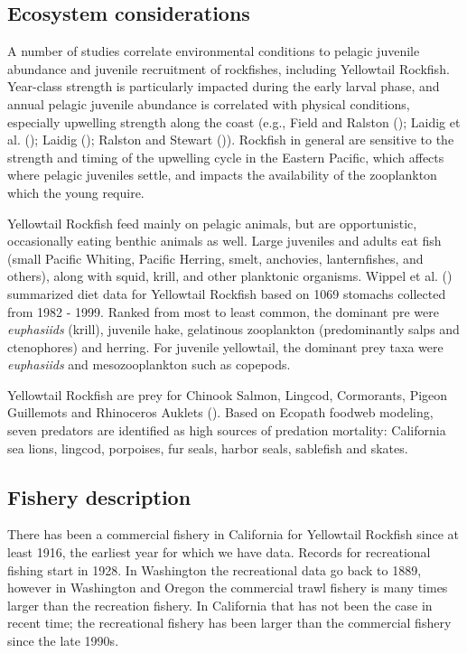 \documentclass[
]{scrartcl}
\begin{document}
\subsection{Ecosystem considerations}\label{ecosystem-considerations-1}

A number of studies correlate environmental conditions to pelagic
juvenile abundance and juvenile recruitment of rockfishes, including
Yellowtail Rockfish. Year-class strength is particularly impacted during
the early larval phase, and annual pelagic juvenile abundance is
correlated with physical conditions, especially upwelling strength along
the coast (e.g., Field and Ralston ();
Laidig et al. (); Laidig
(); Ralston and Stewart
()). Rockfish in general are sensitive
to the strength and timing of the upwelling cycle in the Eastern
Pacific, which affects where pelagic juveniles settle, and impacts the
availability of the zooplankton which the young require.

Yellowtail Rockfish feed mainly on pelagic animals, but are
opportunistic, occasionally eating benthic animals as well. Large
juveniles and adults eat fish (small Pacific Whiting, Pacific Herring,
smelt, anchovies, lanternfishes, and others), along with squid, krill,
and other planktonic organisms. Wippel et al.
() summarized diet data for Yellowtail
Rockfish based on 1069 stomachs collected from 1982 - 1999. Ranked from
most to least common, the dominant pre were \emph{euphasiids} (krill),
juvenile hake, gelatinous zooplankton (predominantly salps and
ctenophores) and herring. For juvenile yellowtail, the dominant prey
taxa were \emph{euphasiids} and mesozooplankton such as copepods.

Yellowtail Rockfish are prey for Chinook Salmon, Lingcod, Cormorants,
Pigeon Guillemots and Rhinoceros Auklets (). Based on Ecopath foodweb modeling, seven predators are
identified as high sources of predation mortality: California sea lions,
lingcod, porpoises, fur seals, harbor seals, sablefish and skates.

\subsection{Fishery description}\label{fishery-description}

There has been a commercial fishery in California for Yellowtail
Rockfish since at least 1916, the earliest year for which we have data.
Records for recreational fishing start in 1928. In Washington the
recreational data go back to 1889, however in Washington and Oregon the
commercial trawl fishery is many times larger than the recreation
fishery. In California that has not been the case in recent time; the
recreational fishery has been larger than the commercial fishery since
the late 1990s.
\end{document}

